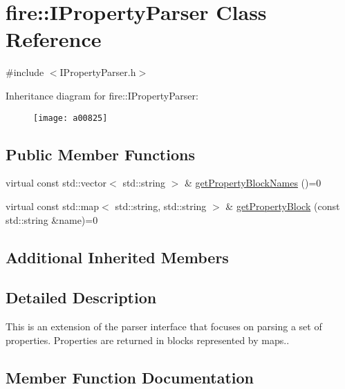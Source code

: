 \hypertarget{a00825}{}\section{fire\+:\+:I\+Property\+Parser Class Reference}
\label{a00825}


{\ttfamily \#include $<$I\+Property\+Parser.\+h$>$}

Inheritance diagram for fire\+:\+:I\+Property\+Parser\+:\begin{figure}[H]
\begin{center}
\leavevmode
\texttt{[image: a00825]}
\end{center}
\end{figure}
\subsection*{Public Member Functions}
\begin{DoxyCompactItemize}
\item 
virtual const std\+::vector$<$ std\+::string $>$ \& \hyperlink{a00825_a34602687f9d1affac7bd842102d4a6aa}{get\+Property\+Block\+Names} ()=0
\item 
virtual const std\+::map$<$ std\+::string, std\+::string $>$ \& \hyperlink{a00825_a34201371cb36dd09e96a66242ececb86}{get\+Property\+Block} (const std\+::string \&name)=0
\end{DoxyCompactItemize}
\subsection*{Additional Inherited Members}


\subsection{Detailed Description}
This is an extension of the parser interface that focuses on parsing a set of properties. Properties are returned in blocks represented by maps.. 

\subsection{Member Function Documentation}
\mbox{\label{a00825_a34201371cb36dd09e96a66242ececb86}} 
